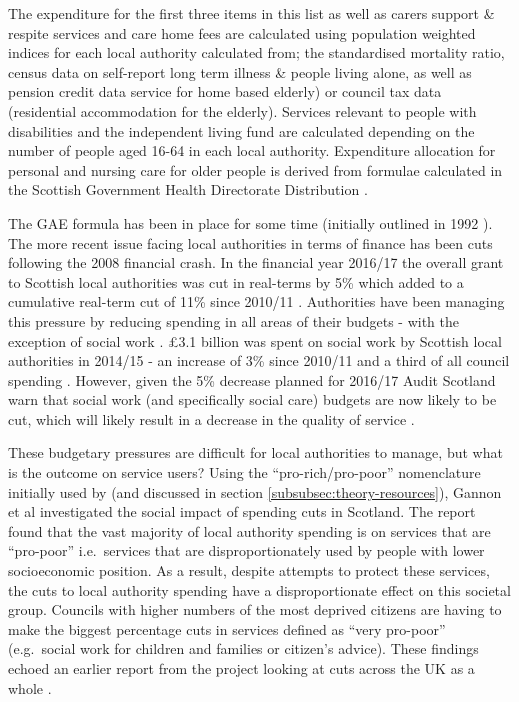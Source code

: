 \documentclass[12pt,]{report}
\begin{document}
The expenditure for the first three items in this list as well as carers
support \& respite services and care home fees are calculated using
population weighted indices for each local authority calculated from;
the standardised mortality ratio, census data on self-report long term
illness \& people living alone, as well as pension credit data service
for home based elderly) or council tax data (residential accommodation
for the elderly). Services relevant to people with disabilities and the
independent living fund are calculated depending on the number of people
aged 16-64 in each local authority. Expenditure allocation for personal
and nursing care for older people is derived from formulae calculated in
the Scottish Government Health Directorate Distribution \citep{RN450}.

The GAE formula has been in place for some time (initially outlined in
1992 \citep{RN450}). The more recent issue facing local authorities in
terms of finance has been cuts following the 2008 financial crash. In
the financial year 2016/17 the overall grant to Scottish local
authorities was cut in real-terms by 5\% which added to a cumulative
real-term cut of 11\% since 2010/11 \citep{RN447}. Authorities have been
managing this pressure by reducing spending in all areas of their
budgets - with the exception of social work \citep{RN447}. £3.1 billion
was spent on social work by Scottish local authorities in 2014/15 - an
increase of 3\% since 2010/11 and a third of all council spending
\citep{RN446}. However, given the 5\% decrease planned for 2016/17 Audit
Scotland \citeyearpar{RN447} warn that social work (and specifically
social care) budgets are now likely to be cut, which will likely result
in a decrease in the quality of service \citep{RN446}.

These budgetary pressures are difficult for local authorities to manage,
but what is the outcome on service users? Using the
``pro-rich/pro-poor'' nomenclature initially used by \citep{RN440} (and
discussed in section \ref{subsubsec:theory-resources}), Gannon et al
\citeyearpar{RN235} investigated the social impact of spending cuts in
Scotland. The report found that the vast majority of local authority
spending is on services that are ``pro-poor'' i.e.~services that are
disproportionately used by people with lower socioeconomic position. As
a result, despite attempts to protect these services, the cuts to local
authority spending have a disproportionate effect on this societal
group. Councils with higher numbers of the most deprived citizens are
having to make the biggest percentage cuts in services defined as ``very
pro-poor'' (e.g.~social work for children and families or citizen's
advice). These findings echoed an earlier report from the project
looking at cuts across the UK as a whole \citep{RN117}.
\end{document}
